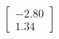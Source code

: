 \documentclass[preview]{standalone}
\begin{document}
\begin{align*}
\begin{bmatrix} -2.80 \\ 1.34 \end{bmatrix}
\end{align*}
\end{document}
